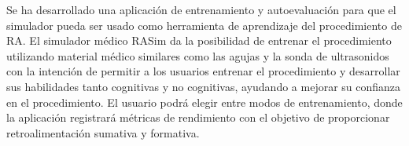 Se ha desarrollado una aplicación de entrenamiento y autoevaluación para que el simulador pueda ser usado como herramienta de aprendizaje del procedimiento de \ac{RA}. 
El simulador médico \ac{RASim} da la posibilidad de entrenar el procedimiento utilizando material médico similares como las agujas y la sonda de ultrasonidos con la intención de permitir a los usuarios entrenar el procedimiento y desarrollar sus habilidades tanto cognitivas y no cognitivas, ayudando a mejorar su confianza en el procedimiento. El usuario podrá elegir entre modos de entrenamiento, donde la  aplicación registrará métricas de rendimiento con el objetivo de proporcionar retroalimentación sumativa y formativa. %









